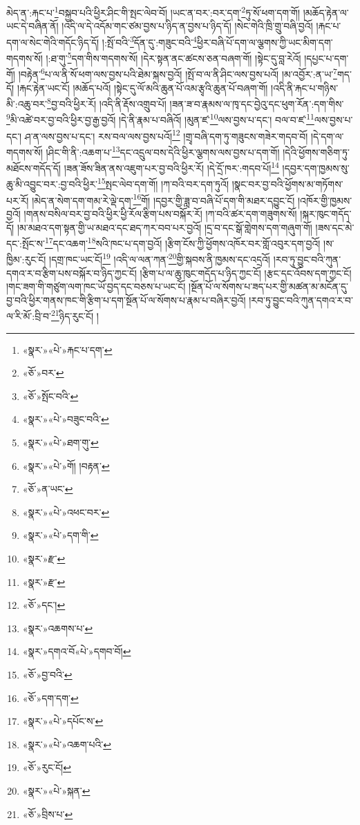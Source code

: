 མེད་ན་:རྐང་པ་\footnote{«སྣར་»«པེ་»རྐང་པ་དག་}བསྐྱབ་པའི་ཕྱིར་ཤིང་གི་སྤང་ལེབ་བོ། །ཡང་ན་བར་:བར་དག་\footnote{«ཅོ་»བར་}ཏུ་སོ་ཕག་དག་གོ། །མཆོད་རྟེན་ལ་ཡང་དེ་བཞིན་ནོ། །འདི་ལ་དེ་འདོམ་གང་ཙམ་བྱས་པ་ཉིད་ན་བྱས་པ་ཉིད་དོ། །སེང་གེའི་ཁྲི་གྲུ་བཞི་བྱའོ། །རྐང་པ་དག་ལ་སེང་གེའི་གདོང་ཉིད་དོ། །:སྤོ་བའི་\footnote{«ཅོ་»སྤོང་བའི་}དོན་དུ་:གཟུང་བའི་\footnote{«སྣར་»«པེ་»བཟུང་བའི་}ཕྱིར་བཞི་པོ་དག་ལ་ལྕགས་ཀྱི་ཡང་མིག་དག་གདགས་སོ། །:ཐ་གུ་\footnote{«སྣར་»«པེ་»ཐག་གུ་}དག་གིས་གདགས་སོ། །དེར་སྟན་ནང་ཚངས་ཅན་བཞག་གོ། །སྟེང་དུ་བླ་རེའོ། །དཔྱང་པ་དག་གོ། །བརྟེན་\footnote{«སྣར་»«པེ་»གོ། །བརྟན་}པ་ལ་ནི་སོ་ཕག་ལས་བྱས་པའི་ཐེམ་སྐས་བྱའོ། །སྤོ་བ་ལ་ནི་ཤིང་ལས་བྱས་པའོ། །མ་འབྱོར་:ན་ཡ་\footnote{«ཅོ་»ན་ཡང་}གད་དོ། །རྐང་རྟེན་ཡང་ངོ། །མཆོད་པའོ། །སྟེང་དུ་ལོ་མའི་ཆུན་པོ་འམ་རྩྭའི་ཆུན་པོ་བཞག་གོ། །འདི་ནི་རྐང་པ་གཉིས་མི་:འཆུ་བར་\footnote{«སྣར་»«པེ་»འཕང་བར་}བྱ་བའི་ཕྱིར་རོ། །འདི་ནི་རྡོས་འགྲུབ་པོ། །ཟན་ཟ་བ་རྣམས་ལ་ཁྭ་དང་བྱེའུ་དང་ཕུག་རོན་:དག་གིས་\footnote{«སྣར་»«པེ་»དག་གི་}མི་འཚེ་བར་བྱ་བའི་ཕྱིར་བྱ་རྒྱ་བྱའོ། །དེ་ནི་རྣམ་པ་བཞིའོ། །མུན་ཛ་\footnote{«སྣར་»རྫ་}ལས་བྱས་པ་དང་། བལ་བ་ཛ་\footnote{«སྣར་»རྫ་}ལས་བྱས་པ་དང་། ཤ་ན་ལས་བྱས་པ་དང་། རས་བལ་ལས་བྱས་པའོ།\footnote{«ཅོ་»དང་།} །གྲྭ་བཞི་དག་ཏུ་གཟུངས་གཟེར་གདབ་བོ། །དེ་དག་ལ་གདགས་སོ། །ཤིང་གི་ནི་:འཆག་པ་\footnote{«སྣར་»འཆགས་པ་}དང་འདྲུལ་བས་དེའི་ཕྱིར་ལྕགས་ལས་བྱས་པ་དག་གོ། །དེའི་ཕྱོགས་གཅིག་ཏུ་མཐོངས་གདོད་དོ། །ཟན་ཟོས་ཟིན་ནས་འཇུག་པར་བྱ་བའི་ཕྱིར་རོ། །དེ་དྲོ་ཁར་:གདབ་པོ།\footnote{«སྣར་»དགའ་བོ«པེ་»དགབ་བོ།} །དབྱར་དག་ཁྱམས་སུ་ཆུ་མི་འབྱུང་བར་:བྱ་བའི་ཕྱིར་\footnote{«ཅོ་»བྱ་བའི་}སྤང་ལེབ་དག་གོ། །ཀ་བའི་བར་དག་ཏུའོ། །སྣང་བར་བྱ་བའི་ཕྱོགས་མ་གཏོགས་པར་རོ། །མེད་ན་སེག་དག་གམ་རེ་ལྡེ་དག་\footnote{«ཅོ་»དག་དག་}གོ། །དབྱར་གྱི་ཟླ་བ་བཞི་པོ་དག་གི་མཐར་དབྱུང་ངོ། །འཁོར་གྱི་ཁྱམས་བྱའོ། །གནས་བསིལ་བར་བྱ་བའི་ཕྱིར་ཕྱི་རོལ་རྩིག་པས་བསྐོར་རོ། །ཀ་བའི་ཚར་དག་གཟུགས་སོ། །སྐར་ཁུང་གདོད་དོ། །མ་མཐའ་དག་སྟན་གྱི་ཡ་མཐའ་དང་ཐད་ཀར་བབ་པར་བྱའོ། །དྲ་བ་དང་སྒོ་གླེགས་དག་གཞུག་གོ། །ཟས་དང་མེ་དང་:སྤོང་ས་\footnote{«སྣར་»«པེ་»དཔོང་ས་}དང་འཆག་\footnote{«སྣར་»«པེ་»འཆག་པའི་}སའི་ཁང་པ་དག་བྱའོ། །རྩིག་ངོས་ཀྱི་ཕྱོགས་འཁོར་བར་གློ་འབུར་དག་བྱའོ། །ས་ཁྱིམ་:རུང་ངོ། །དགྲ་ཁང་ཡང་ངོ།\footnote{«ཅོ་»རུང་ངོ།} །འདི་ལ་ལན་ཀན་\footnote{«སྣར་»«པེ་»སྐན་}གྱི་སྐབས་ནི་ཁྱམས་དང་འདྲའོ། །རབ་ཏུ་བྱུང་བའི་ཀུན་དགའ་ར་བ་རྩིག་པས་བསྐོར་བ་ཉིད་ཀྱང་ངོ། །རྩིག་པ་ལ་ཆུ་ཁུང་གདོད་པ་ཉིད་ཀྱང་ངོ། །རྩང་དང་འོབས་དག་ཀྱང་ངོ། །གང་ཟག་གི་གཙུག་ལག་ཁང་ཡོ་བྱད་དང་བཅས་པ་ཡང་ངོ། །སྔོན་པོ་ལ་སོགས་པ་ཟད་པར་གྱི་མཚན་མ་མངོན་དུ་བྱ་བའི་ཕྱིར་གནས་ཁང་གི་རྩིག་པ་དག་སྔོན་པོ་ལ་སོགས་པ་རྣམ་པ་བཞིར་བྱའོ། །རབ་ཏུ་བྱུང་བའི་ཀུན་དགའ་ར་བ་ལ་རི་མོ་:བྲི་བ་\footnote{«ཅོ་»བྲིས་པ་}ཉིད་རུང་ངོ། །
